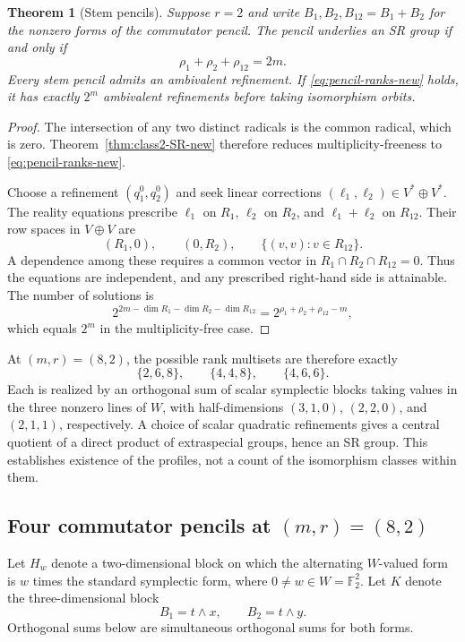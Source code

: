 \documentclass[11pt,a4paper]{amsart}
\newtheorem{thm}{Theorem}[section]
\theoremstyle{definition}
\theoremstyle{remark}
\numberwithin{equation}{section}
\begin{document}
\begin{thm}[Stem pencils]\label{thm:class2-pencil-new}
Suppose $r=2$ and write $B_1,B_2,B_{12}=B_1+B_2$ for the nonzero
forms of the commutator pencil. The pencil underlies an SR group if
and only if
\begin{equation}\label{eq:pencil-ranks-new}
 \rho_1+\rho_2+\rho_{12}=2m.
\end{equation}
Every stem pencil admits an ambivalent refinement. If
\eqref{eq:pencil-ranks-new} holds, it has exactly $2^m$ ambivalent
refinements before taking isomorphism orbits.
\end{thm}
\begin{proof}
The intersection of any two distinct radicals is the common radical,
which is zero. Theorem~\ref{thm:class2-SR-new} therefore reduces
multiplicity-freeness to \eqref{eq:pencil-ranks-new}.

Choose a refinement $(q_1^0,q_2^0)$ and seek linear corrections
$(\ell_1,\ell_2)\in V^*\oplus V^*$. The reality equations prescribe
$\ell_1$ on $R_1$, $\ell_2$ on $R_2$, and $\ell_1+\ell_2$ on
$R_{12}$. Their row spaces in $V\oplus V$ are
\[
 (R_1,0),\qquad (0,R_2),\qquad
 \{(v,v):v\in R_{12}\}.
\]
A dependence among these requires a common vector in
$R_1\cap R_2\cap R_{12}=0$. Thus the equations are independent,
and any prescribed right-hand side is attainable. The number of
solutions is
\[
 2^{2m-\dim R_1-\dim R_2-\dim R_{12}}
 =2^{\rho_1+\rho_2+\rho_{12}-m},
\]
which equals $2^m$ in the multiplicity-free case.
\end{proof}

At $(m,r)=(8,2)$, the possible rank multisets are therefore exactly
\[
 \{2,6,8\},\qquad \{4,4,8\},\qquad \{4,6,6\}.
\]
Each is realized by an orthogonal sum of scalar symplectic blocks
taking values in the three nonzero lines of $W$, with half-dimensions
$(3,1,0)$, $(2,2,0)$, and $(2,1,1)$, respectively. A choice of scalar
quadratic refinements gives a central quotient of a direct product
of extraspecial groups, hence an SR group. This establishes existence
of the profiles, not a count of the isomorphism classes within them.


\subsection{Four commutator pencils at \texorpdfstring{$(m,r)=(8,2)$}{(m,r)=(8,2)}}

Let $H_w$ denote a two-dimensional block on which the alternating
$W$-valued form is $w$ times the standard symplectic form,
where $0\ne w\in W=\mathbb F_2^2$. Let $K$ denote the
three-dimensional block
\[
 B_1=t\wedge x,\qquad B_2=t\wedge y.
\]
Orthogonal sums below are simultaneous orthogonal sums for both forms.
\end{document}
